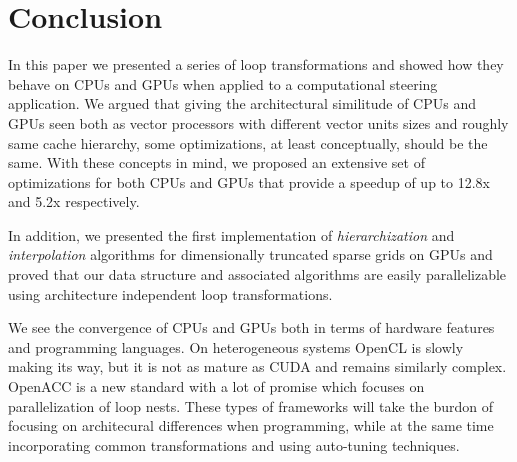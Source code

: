 \section{Conclusion}
\label{sec:conclusion}

In this paper we presented a series of loop transformations and showed
how they behave on CPUs and GPUs when applied to a computational steering
application. We argued that giving the architectural similitude of CPUs and GPUs
seen both as vector processors with different vector units sizes and roughly
same cache hierarchy, some optimizations, at least conceptually, should be the
same. With these concepts in mind, we proposed an extensive set of optimizations
for both CPUs and GPUs that provide a speedup of up to 12.8x and 5.2x
respectively.

In addition, we presented the first implementation of \textit{hierarchization} and
\textit{interpolation} algorithms for dimensionally truncated sparse grids on GPUs
and proved that our data structure and associated algorithms are easily 
parallelizable using architecture independent loop transformations.

We see the convergence of CPUs and GPUs both in terms of hardware features and
programming languages. On heterogeneous systems OpenCL \cite{opencl} is slowly
making its way, but it is not as mature as CUDA and remains similarly complex.
OpenACC \cite{openacc} is a new standard with a lot of promise which focuses on
parallelization of loop nests. These types of frameworks will take the burdon
of focusing on architecural differences when programming, while at the same time
incorporating common transformations and using auto-tuning techniques.
